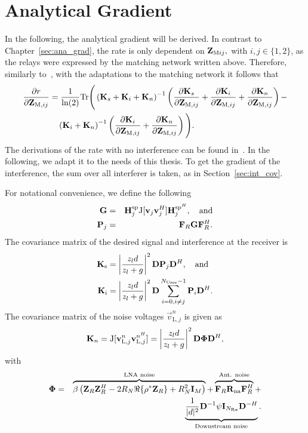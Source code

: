 \section{Analytical Gradient}
In the following, the analytical gradient will be derived.
In contrast to Chapter~\ref{sec:ana_grad}, the rate is only dependent on $\mathbf{Z}_{\text{M}ij},$ with $i,j\in\{1,2\}$, as the relays were expressed by the matching network written above.
Therefore, similarly to~\cite{Yahia2013}, with the adaptations to the matching network it follows that
\begin{align}
\label{eq:gradient}\nonumber
\frac{\partial r}{\partial\mathbf{Z}_{\text{M},ij}} &= \frac{1}{\text{ln}(2)} 
\text{Tr}\Bigg(\left(\mathbf{K}_s + \mathbf{K}_i + \mathbf{K}_n\right)^{-1}
\left(\frac{\partial\mathbf{K}_s}{\partial\mathbf{Z}_{\text{M},ij}}+
 \frac{\partial\mathbf{K}_i}{\partial\mathbf{Z}_{\text{M},ij}}+
 \frac{\partial\mathbf{K}_n}{\partial\mathbf{Z}_{\text{M},ij}}\right)-\\
 &\quad\left(\mathbf{K}_i+\mathbf{K}_n\right)^{-1}
 \left(\frac{\partial\mathbf{K}_i}{\partial\mathbf{Z}_{\text{M},ij}}+
 	\frac{\partial\mathbf{K}_n}{\partial\mathbf{Z}_{\text{M},ij}}\right)\Bigg).
\end{align}
The derivations of the rate with no interference can be found in~\cite{Yahia2013}.
In the following, we adapt it to the needs of this thesis.
To get the gradient of the interference, the sum over all interferer is taken, as in Section~\ref{sec:int_cov}.

For notational convenience, we define the following %
\begin{eqnarray}
\mathbf{G}&=&\mathbf{H}_j^{\text{sp}}\text{J}[\mathbf{v}_j\mathbf{v}_j^H]\mathbf{H}_j^{\text{sp}^H},\quad\text{and} \nonumber \\
\mathbf{P}_j&=&\mathbf{F}_R\mathbf{G}\mathbf{F}_R^H \label{eqX}.
\end{eqnarray}
The covariance matrix of the desired signal and interference at the receiver is
\begin{align}
\mathbf{K}_\text{s}&=\left|\frac{z_ld}{z_l+g}\right|^2\mathbf{D}\mathbf{P}_j\mathbf{D}^H,\quad\text{and}\\
\mathbf{K}_\text{i}&=\left|\frac{z_ld}{z_l+g}\right|^2\mathbf{D}\sum_{i=0,i\neq j}^{N_\text{User}-1}\mathbf{P}_i\mathbf{D}^H.
\label{CovSignal}
\end{align}
 The covariance matrix of the noise voltages $\vec{v}_{\text{L},j}^n$ is given as  
\begin{eqnarray}
\mathbf{K}_{n}=\text{J}[\mathbf{v}_{\text{L},j}^n\mathbf{v}_{\text{L},j}^{n^H}]= 
\left|\frac{z_ld}{z_l+g}\right|^2\mathbf{D}\mathbf{\Phi} \mathbf{D}^H ,
\label{NoiseCorr}
\end{eqnarray}
with
\begin{eqnarray}
\mathbf{\Phi} &=&
	\overbrace{ \beta\left(  \mathbf{Z}_{R}\mathbf{Z}_{R}^H-2R_N\Re\{ \rho^* \mathbf{Z}_{R}\}+R_N^2\mathbf{I}_M\right)}^{\text{LNA noise}}  +
	\overbrace{\mathbf{F}_R\mathbf{R}_{\text{na}}\mathbf{F}_R^H}^{\text{Ant. noise}} + \nonumber \\
	&& \underbrace{\frac{1}{|d|^2}\mathbf{D}^{-1}\psi\mathbf{I}_{N_\text{Rx}}\mathbf{D}^{{-H}}}_{\text{Downstream noise}}.
\label{eq9}
\end{eqnarray} 

